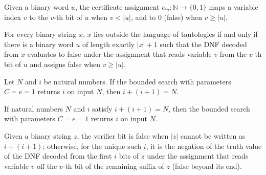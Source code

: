 \begin{definition}
\label{Complexity.tautAssignment}
\leanok
Given a binary word $u$, the certificate assignment $\alpha_u : \mathbb{N} \to \{0,1\}$
maps a variable index $v$ to the $v$-th bit of $u$ when $v < |u|$, and to $0$ (false)
when $v \ge |u|$.
\end{definition}

\begin{lemma}
\label{Complexity.taut_certificate_equiv}
\leanok
{}
For every binary string $x$, $x$ lies outside the language of tautologies if and only if
there is a binary word $u$ of length exactly $|x|+1$ such that the DNF decoded from $x$
evaluates to false under the assignment that reads variable $v$ from the $v$-th bit of
$u$ and assigns false when $v\ge |u|$.
\end{lemma}

\begin{lemma}
\label{Complexity.taut_split_some}
\leanok
{}
Let $N$ and $i$ be natural numbers. If the bounded search with parameters $C=e=1$
returns $i$ on input $N$, then $i+(i+1)=N$.
\end{lemma}

\begin{lemma}
\label{Complexity.taut_split_exists}
\leanok
{}
If natural numbers $N$ and $i$ satisfy $i+(i+1)=N$, then the bounded search with
parameters $C=e=1$ returns $i$ on input $N$.
\end{lemma}

\begin{definition}
\label{Complexity.tautVerifierBit}
\leanok
{}
Given a binary string $z$, the verifier bit is false when $|z|$ cannot be written as
$i + (i + 1)$; otherwise, for the unique such $i$, it is the negation of the truth
value of the DNF decoded from the first $i$ bits of $z$ under the assignment that
reads variable $v$ off the $v$-th bit of the remaining suffix of $z$ (false beyond
its end).
\end{definition}

